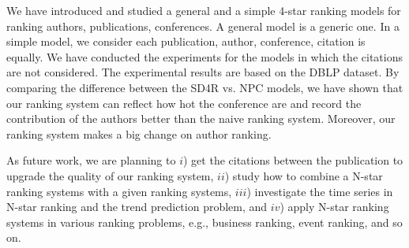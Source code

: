 \documentclass[10pt,leqno,twoside]{article}
\begin{document}
We have introduced and studied a general and a simple 4-star ranking models for ranking authors, publications, conferences. A general model is a generic one. In a simple model, we consider each publication, author, conference, citation is equally. We have conducted the experiments for the models in which the citations are not considered. The experimental results are based on the DBLP dataset. By comparing the difference between the SD4R vs. NPC models, we have shown that our ranking system can reflect how hot the conference are and record the contribution of the authors better than the naive ranking system. Moreover, our ranking system makes a big change on author ranking.

As future work, we are planning to $i$) get the citations between the publication to upgrade the quality of our ranking system, $ii$) study how to combine a N-star ranking systems with a given ranking systems, $iii$) investigate the time series in N-star ranking and the trend prediction problem, and $iv$) apply N-star ranking systems in various ranking problems, e.g., business ranking, event ranking, and so on.
\end{document}
